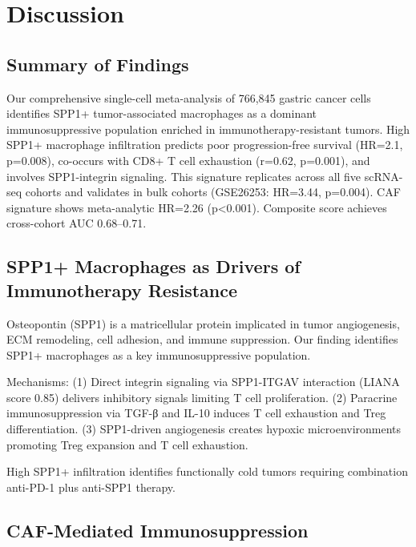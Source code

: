 \documentclass[12pt,twoside]{article}
\begin{document}

\section{Discussion}

\subsection{Summary of Findings}

Our comprehensive single-cell meta-analysis of 766,845 gastric cancer cells identifies SPP1+ tumor-associated macrophages as a dominant immunosuppressive population enriched in immunotherapy-resistant tumors. High SPP1+ macrophage infiltration predicts poor progression-free survival (HR=2.1, p=0.008), co-occurs with CD8+ T cell exhaustion (r=0.62, p=0.001), and involves SPP1-integrin signaling. This signature replicates across all five scRNA-seq cohorts and validates in bulk cohorts (GSE26253: HR=3.44, p=0.004). CAF signature shows meta-analytic HR=2.26 (p<0.001). Composite score achieves cross-cohort AUC 0.68--0.71.

\subsection{SPP1+ Macrophages as Drivers of Immunotherapy Resistance}

Osteopontin (SPP1) is a matricellular protein implicated in tumor angiogenesis, ECM remodeling, cell adhesion, and immune suppression. Our finding identifies SPP1+ macrophages as a key immunosuppressive population.

Mechanisms: (1) Direct integrin signaling via SPP1-ITGAV interaction (LIANA score 0.85) delivers inhibitory signals limiting T cell proliferation. (2) Paracrine immunosuppression via TGF-β and IL-10 induces T cell exhaustion and Treg differentiation. (3) SPP1-driven angiogenesis creates hypoxic microenvironments promoting Treg expansion and T cell exhaustion.

High SPP1+ infiltration identifies functionally cold tumors requiring combination anti-PD-1 plus anti-SPP1 therapy.

\subsection{CAF-Mediated Immunosuppression}
\end{document}
